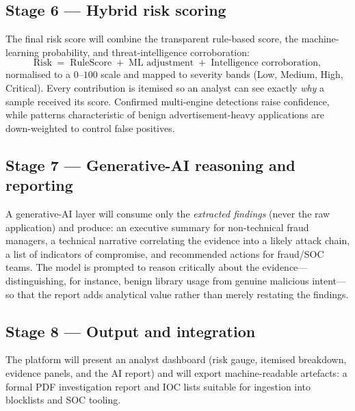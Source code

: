 \documentclass[11pt,a4paper]{article}
\begin{document}
\subsection{Stage 6 --- Hybrid risk scoring}
The final risk score will combine the transparent rule-based score, the machine-learning
probability, and threat-intelligence corroboration:
\[
\text{Risk} \;=\; \text{RuleScore} \;+\; \text{ML adjustment} \;+\;
\text{Intelligence corroboration},
\]
normalised to a $0$--$100$ scale and mapped to severity bands (Low, Medium, High,
Critical). Every contribution is itemised so an analyst can see exactly \emph{why} a
sample received its score. Confirmed multi-engine detections raise confidence, while
patterns characteristic of benign advertisement-heavy applications are down-weighted to
control false positives.

\subsection{Stage 7 --- Generative-AI reasoning and reporting}
A generative-AI layer will consume only the \emph{extracted findings} (never the raw
application) and produce: an executive summary for non-technical fraud managers, a
technical narrative correlating the evidence into a likely attack chain, a list of
indicators of compromise, and recommended actions for fraud/SOC teams. The model is
prompted to reason critically about the evidence---distinguishing, for instance, benign
library usage from genuine malicious intent---so that the report adds analytical value
rather than merely restating the findings.

\subsection{Stage 8 --- Output and integration}
The platform will present an analyst dashboard (risk gauge, itemised breakdown, evidence
panels, and the AI report) and will export machine-readable artefacts: a formal PDF
investigation report and IOC lists suitable for ingestion into blocklists and SOC
tooling.

\end{document}
